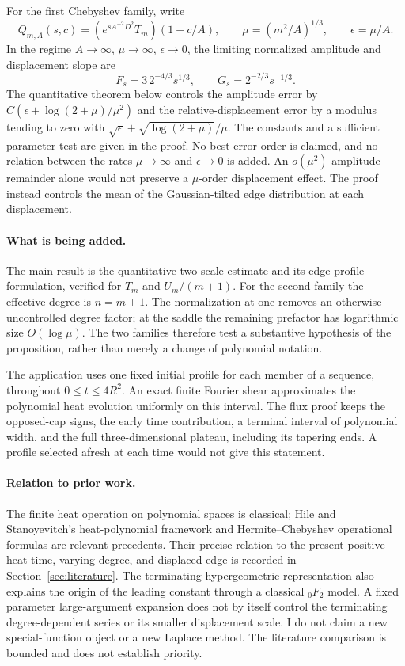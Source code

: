 \documentclass[11pt]{article}
\theoremstyle{definition}
\begin{document}
For the first Chebyshev family, write
\[
 Q_{m,A}(s,c)=(e^{sA^{-2}D^2}T_m)(1+c/A),\qquad
 \mu=(m^2/A)^{1/3},\qquad \epsilon=\mu/A.
\]
In the regime $A\to\infty$, $\mu\to\infty$, $\epsilon\to0$, the
limiting normalized amplitude and displacement slope are
\[
 F_s=3\,2^{-4/3}s^{1/3},\qquad G_s=2^{-2/3}s^{-1/3}.
\]
The quantitative theorem below controls the amplitude error by
$C(\epsilon+\log(2+\mu)/\mu^2)$ and the relative-displacement
error by a modulus tending to zero with
$\sqrt\epsilon+\sqrt{\log(2+\mu)}/\mu$.
The constants and a sufficient parameter test are given in the proof.
No best error order is claimed, and no relation between the rates
$\mu\to\infty$ and $\epsilon\to0$ is added.
An $o(\mu^2)$ amplitude remainder alone would not preserve a
$\mu$-order displacement effect. The proof instead controls the
mean of the Gaussian-tilted edge distribution at each displacement.

\paragraph{What is being added.}
The main result is the quantitative two-scale estimate and its
edge-profile formulation, verified for $T_m$ and $U_m/(m+1)$.
For the second family the effective degree is $n=m+1$.
The normalization at one removes an otherwise uncontrolled degree
factor; at the saddle the remaining prefactor has logarithmic size
$O(\log\mu)$. The two families therefore test a substantive hypothesis
of the proposition, rather than merely a change of polynomial notation.

The application uses one fixed initial profile for each member of a
sequence, throughout $0\le t\le4R^2$. An exact finite Fourier shear
approximates the polynomial heat evolution uniformly on this interval.
The flux proof keeps the opposed-cap signs, the early time contribution,
a terminal interval of polynomial width, and the full three-dimensional
plateau, including its tapering ends. A profile selected afresh at each
time would not give this statement.

\paragraph{Relation to prior work.}
The finite heat operation on polynomial spaces is classical;
Hile and Stanoyevitch's heat-polynomial framework and Hermite--Chebyshev
operational formulas are relevant precedents. Their precise relation to
the present positive heat time, varying degree, and displaced edge is
recorded in Section~\ref{sec:literature}.
The terminating hypergeometric representation also explains the origin
of the leading constant through a classical ${}_0F_2$ model. A fixed
parameter large-argument expansion does not by itself control the
terminating degree-dependent series or its smaller displacement scale.
I do not claim a new special-function object or a new Laplace method.
The literature comparison is bounded and does not establish priority.
\end{document}
